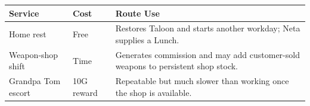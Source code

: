 \documentclass[
  american,
  10pt,
  letterpaper,
  oneside,
  open=any]{scrreprt}
\newcounter{none} %
\newenvironment{guidetable}{%
  \small\setstretch{1.0}%
  \setlength{\tabcolsep}{4pt}%
  \setlength{\LTpre}{8pt}\setlength{\LTpost}{10pt}%
  \renewcommand{\arraystretch}{1.16}%
}{ }
\begin{document}
\begin{guidetable}

{\def\LTcaptype{none} %
\begin{longtable}[]{@{}
  >{\raggedright\arraybackslash}p{}
  >{\raggedleft\arraybackslash}p{}
  >{\raggedright\arraybackslash}p{}@{}}
\toprule\noalign{}
\begin{minipage}[b]{\linewidth}\raggedright
\color{GuideGreen}\bfseries Service
\end{minipage} & \begin{minipage}[b]{\linewidth}\raggedleft
\color{GuideGreen}\bfseries Cost
\end{minipage} & \begin{minipage}[b]{\linewidth}\raggedright
\color{GuideGreen}\bfseries Route Use
\end{minipage} \\
\midrule\noalign{}
\endhead
\bottomrule\noalign{}
\endlastfoot
Home rest & Free & Restores Taloon and starts another workday; Neta
supplies a Lunch. \\
Weapon-shop shift & Time & Generates commission and may add
customer-sold weapons to persistent shop stock. \\
Grandpa Tom escort & 10G reward & Repeatable but much slower than
working once the shop is available. \\
\end{longtable}
}

\end{guidetable}
\end{document}
